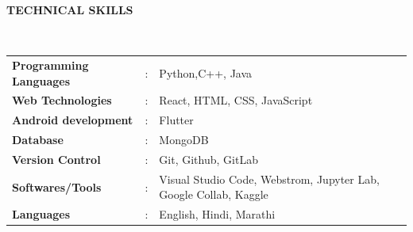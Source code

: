 \documentclass[a4paper,10pt]{article}
\begin{document}
\colorbox{titleColor}{\parbox{6.7in}{\textbf{TECHNICAL SKILLS}}}\\

\begin{tabular}{p{1.6in}p{0.1in}p{4.5in}}
  \textbf{\small{Programming Languages}} & : & {{Python,C++, Java}}                                                              \\
  \textbf{\small{Web Technologies}}      & : & {{React, HTML, CSS, JavaScript }}                                          \\
  \textbf{\small{Android development}}   & : & {{Flutter}}                                                                       \\
  \textbf{\small{Database}}              & : & {{MongoDB}}                                                                       \\
  \textbf{\small{Version Control}}       & : & {{Git, Github, GitLab}}                                                           \\
  \textbf{\small{Softwares/Tools}}       & : & {{ Visual Studio Code, Webstrom, Jupyter Lab, Google Collab, Kaggle}} \\
  \textbf{\small{Languages}}       & : & {{ English, Hindi, Marathi}} \\
\end{tabular}


\end{document}

